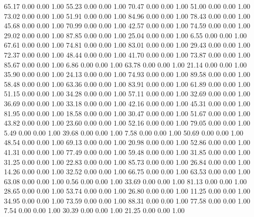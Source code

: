    65.17   0.00   0.00   1.00
   55.23   0.00   0.00   1.00
   70.47   0.00   0.00   1.00
   51.00   0.00   0.00   1.00
   73.02   0.00   0.00   1.00
   51.91   0.00   0.00   1.00
   84.96   0.00   0.00   1.00
   78.43   0.00   0.00   1.00
   45.68   0.00   0.00   1.00
   70.99   0.00   0.00   1.00
   42.57   0.00   0.00   1.00
   74.59   0.00   0.00   1.00
   29.02   0.00   0.00   1.00
   87.85   0.00   0.00   1.00
   25.04   0.00   0.00   1.00
    6.55   0.00   0.00   1.00
   67.61   0.00   0.00   1.00
   74.81   0.00   0.00   1.00
   83.01   0.00   0.00   1.00
   29.43   0.00   0.00   1.00
   72.37   0.00   0.00   1.00
   48.44   0.00   0.00   1.00
   41.70   0.00   0.00   1.00
   73.87   0.00   0.00   1.00
   85.67   0.00   0.00   1.00
    6.86   0.00   0.00   1.00
   63.78   0.00   0.00   1.00
   21.14   0.00   0.00   1.00
   35.90   0.00   0.00   1.00
   24.13   0.00   0.00   1.00
   74.93   0.00   0.00   1.00
   89.58   0.00   0.00   1.00
   58.48   0.00   0.00   1.00
   63.36   0.00   0.00   1.00
   83.91   0.00   0.00   1.00
   61.89   0.00   0.00   1.00
   51.15   0.00   0.00   1.00
   34.28   0.00   0.00   1.00
   57.11   0.00   0.00   1.00
   32.69   0.00   0.00   1.00
   36.69   0.00   0.00   1.00
   33.18   0.00   0.00   1.00
   42.16   0.00   0.00   1.00
   45.31   0.00   0.00   1.00
   81.95   0.00   0.00   1.00
   18.58   0.00   0.00   1.00
   30.47   0.00   0.00   1.00
   51.67   0.00   0.00   1.00
   43.82   0.00   0.00   1.00
   23.60   0.00   0.00   1.00
   52.16   0.00   0.00   1.00
   79.05   0.00   0.00   1.00
    5.49   0.00   0.00   1.00
   39.68   0.00   0.00   1.00
    7.58   0.00   0.00   1.00
   50.69   0.00   0.00   1.00
   48.54   0.00   0.00   1.00
   69.13   0.00   0.00   1.00
   20.98   0.00   0.00   1.00
   52.86   0.00   0.00   1.00
   41.31   0.00   0.00   1.00
   77.49   0.00   0.00   1.00
   59.48   0.00   0.00   1.00
   31.85   0.00   0.00   1.00
   31.25   0.00   0.00   1.00
   22.83   0.00   0.00   1.00
   85.73   0.00   0.00   1.00
   26.84   0.00   0.00   1.00
   14.26   0.00   0.00   1.00
   32.52   0.00   0.00   1.00
   66.75   0.00   0.00   1.00
   63.53   0.00   0.00   1.00
   63.08   0.00   0.00   1.00
    0.56   0.00   0.00   1.00
   33.69   0.00   0.00   1.00
   81.13   0.00   0.00   1.00
   28.65   0.00   0.00   1.00
   53.74   0.00   0.00   1.00
   26.80   0.00   0.00   1.00
   11.25   0.00   0.00   1.00
   34.95   0.00   0.00   1.00
   73.59   0.00   0.00   1.00
   88.31   0.00   0.00   1.00
   77.58   0.00   0.00   1.00
    7.54   0.00   0.00   1.00
   30.39   0.00   0.00   1.00
   21.25   0.00   0.00   1.00
